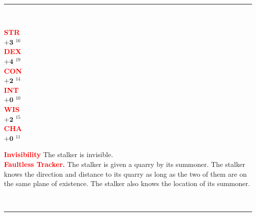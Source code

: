 \documentclass{article}
\begin{document}
\begin{adjustbox}{minipage=0.45\textwidth, margin=\fboxsep, bgimage=../images/texture2.pdf}
{\begin{minipage}[t][10.5in][t]{0.9\textwidth}
\begin{minipage}[t]{0.7\textwidth}
        \end{minipage}
        \vspace{0.025in}\\
        \rule{\textwidth}{1pt}\\
        \vspace{0.025in}
        \begin{minipage}[t]{0.2\textwidth}
            {\large
            \textcolor{red}{\textbf{STR}}\\[0.1em]
            $\mathbf{+3}$\,\,$^{16}$ \\[0.1em]
            \textcolor{red}{\textbf{DEX}}\\[0.1em]
            $\mathbf{+4}$\,\,$^{19}$ \\[0.1em]
            \textcolor{red}{\textbf{CON}}\\[0.1em]
            $\mathbf{+2}$\,\,$^{14}$ \\[0.1em]
            \textcolor{red}{\textbf{INT}}\\[0.1em]
            $\mathbf{+0}$\,\,$^{10}$ \\[0.1em]
            \textcolor{red}{\textbf{WIS}}\\[0.1em]
            $\mathbf{+2}$\,\,$^{15}$ \\[0.1em]
            \textcolor{red}{\textbf{CHA}}\\[0.1em]
            $\mathbf{+0}$\,\,$^{11}$ \\[0.1em]
            }
        \end{minipage}
        \hspace{-0.1in}
        \vline
        \hspace{0.1in}
        \begin{minipage}[t]{0.7\textwidth}
            \textcolor{red}{\textbf{Invisibility}} The stalker is invisible. \\[0.2em]
            \textcolor{red}{\textbf{Faultless Tracker.}} The stalker is given a quarry by its summoner. The stalker knows the direction and distance to its quarry as long as the two of them are on the same plane of existence. The stalker also knows the location of its summoner.
        \end{minipage}
        \vspace{0.025in}\\
        \rule{\textwidth}{1pt}\\
        \vspace{-0.08in}
        \begin{flushleft}

\end{flushleft}
\end{minipage}}
\end{adjustbox}
\end{document}
